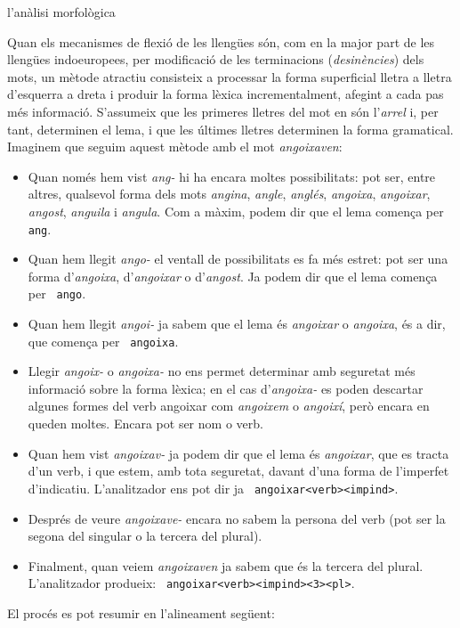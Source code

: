 \begin{persabermes}{l'anàlisi morfològica}

Quan els mecanismes de flexió de les llengües són, com en
la major part de les llengües indoeuropees, per modificació de
les terminacions (\emph{desi\-nèn\-cies}) dels mots, un mètode
atractiu consisteix a processar la forma superficial lletra a lletra
d'esquerra a dreta
i produir la forma lèxica incrementalment, afegint a cada pas
més informació. S'assumeix que les primeres lletres del mot en són l'\emph{arrel}
i, per tant, determinen el lema, i que les últimes lletres
determinen la forma gramatical. Imaginem que seguim aquest mètode
amb el mot \emph{angoixaven}:
\begin{itemize}
\item Quan només hem vist \emph{ang-} hi ha encara
moltes possibilitats: pot ser, entre altres, qualsevol forma dels mots
\emph{angina}, \emph{angle}, \emph{anglés}, \emph{angoixa}, \emph{angoixar}, \emph{angost}, {\em
  anguila} i \emph{angula}. Com a màxim, podem dir que el lema
comença per {\tt ang}.
\item Quan hem llegit \emph{ango-} el ventall de possibilitats es fa
  més estret: pot ser una forma d'\emph{angoixa}, d'\emph{angoixar}
  o  d'\emph{angost}. Ja podem dir que el lema comença per {\tt
    ango}.
\item Quan hem llegit \emph{angoi-} ja sabem que el lema és 
\emph{angoixar} o \emph{angoixa}, és a dir, que comença per {\tt
  angoixa}. 
\item Llegir \emph{angoix-} o \emph{angoixa-} 
no ens permet determinar amb seguretat més informació sobre la
forma lèxica; en el cas d'\emph{angoixa-} es poden descartar algunes formes del
verb angoixar com \emph{angoixem} o \emph{angoixí}, però encara
en queden moltes. Encara pot ser nom o verb.
\item Quan hem vist \emph{angoixav-} ja podem dir que el lema és
  \emph{angoixar}, que es tracta d'un verb, i que estem, amb tota
  seguretat, davant d'una forma de l'imperfet
  d'indicatiu. L'analitzador ens pot dir ja {\tt
    angoixar<verb>\-<impind>}.
\item Després de veure \emph{angoixave-} encara no sabem la persona
  del verb (pot ser la segona del singular o la tercera del plural).
\item Finalment, quan veiem \emph{angoixaven} ja sabem que és la
  tercera del plural. L'analitzador produeix: {\tt
    angoixar<verb><impind><3><pl>}.
\end{itemize}
El procés es pot resumir en l'alineament següent:

\end{persabermes}
